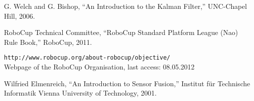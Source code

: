 

\begin{thebibliography}{30}


 G. Welch and G. Bishop, ``An Introduction to the Kalman Filter,'' UNC-Chapel Hill, 2006.

 RoboCup Technical Committee, ``RoboCup Standard Platform League (Nao) Rule Book,'' RoboCup, 2011.

 \texttt{http://www.robocup.org/about-robocup/objective/}\\
Webpage of the RoboCup Organisation, last access:
08.05.2012

 Wilfried Elmenreich, ``An Introduction to Sensor Fusion,'' Institut für Technische Informatik Vienna University of Technology, 2001.


\end{thebibliography}

